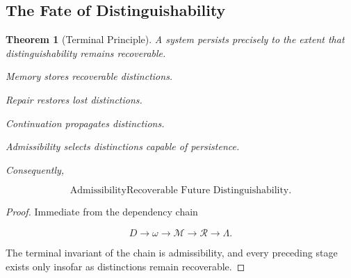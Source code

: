 \documentclass[12pt]{article}
\newtheorem{theorem}{Theorem}[section]
\theoremstyle{remark}
\begin{document}
\subsection{The Fate of Distinguishability}

\begin{theorem}[Terminal Principle]
A system persists precisely to the extent that distinguishability remains recoverable.

Memory stores recoverable distinctions.

Repair restores lost distinctions.

Continuation propagates distinctions.

Admissibility selects distinctions capable of persistence.

Consequently,

\[
\text{Admissibility}
\text{Recoverable Future Distinguishability}.
\]
\end{theorem}

\begin{proof}
Immediate from the dependency chain

\[
D
\rightarrow
\omega
\rightarrow
\mathcal M
\rightarrow
\mathcal R
\rightarrow
\Lambda.
\]

The terminal invariant of the chain is admissibility, and every preceding stage exists only insofar as distinctions remain recoverable.
\end{proof}

\newpage
\end{document}
